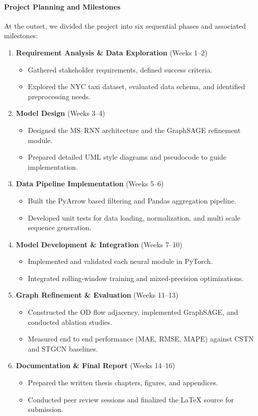 \documentclass{article}
\begin{document}
\paragraph{Project Planning and Milestones}  
At the outset, we divided the project into six sequential phases and associated milestones:

\begin{enumerate}
  \item \textbf{Requirement Analysis \& Data Exploration} (Weeks 1–2)  
    \begin{itemize}
      \item Gathered stakeholder requirements, defined success criteria.  
      \item Explored the NYC taxi dataset, evaluated data schema, and identified preprocessing needs.
    \end{itemize}
  \item \textbf{Model Design} (Weeks 3–4)  
    \begin{itemize}
      \item Designed the MS–RNN architecture and the GraphSAGE refinement module.  
      \item Prepared detailed UML style diagrams and pseudocode to guide implementation.
    \end{itemize}
  \item \textbf{Data Pipeline Implementation} (Weeks 5–6)  
    \begin{itemize}
      \item Built the PyArrow based filtering and Pandas aggregation pipeline.  
      \item Developed unit tests for data loading, normalization, and multi scale sequence generation.
    \end{itemize}
  \item \textbf{Model Development \& Integration} (Weeks 7–10)  
    \begin{itemize}
      \item Implemented and validated each neural module in PyTorch.  
      \item Integrated rolling‐window training and mixed‐precision optimizations.
    \end{itemize}
  \item \textbf{Graph Refinement \& Evaluation} (Weeks 11–13)  
    \begin{itemize}
      \item Constructed the OD flow adjacency, implemented GraphSAGE, and conducted ablation studies.  
      \item Measured end to end performance (MAE, RMSE, MAPE) against CSTN and STGCN baselines.
    \end{itemize}
  \item \textbf{Documentation \& Final Report} (Weeks 14–16)  
    \begin{itemize}
      \item Prepared the written thesis chapters, figures, and appendices.  
      \item Conducted peer review sessions and finalized the LaTeX source for submission.
    \end{itemize}
\end{enumerate}
\end{document}

